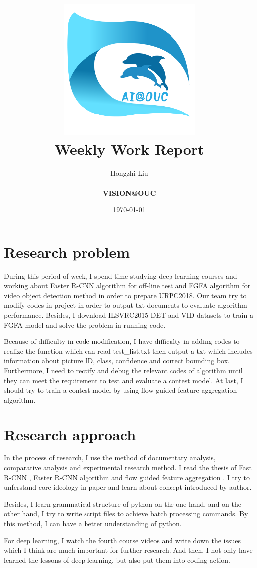 \documentclass[a4paper]{article}
\title{
    \vspace*{1in}
    \includegraphics[width=2.75in]{figures/zhenglab-logo} \\
    \vspace*{1.2in}
    \textbf{\huge Weekly Work Report}
    \vspace{0.2in}
}
\author{Hongzhi Liu \\
    \vspace*{0.5in} \\
    \textbf{VISION@OUC} \\
    \vspace*{1in}
}
\date{\today}
\begin{document}
\par
\maketitle
\setcounter{page}{0}
\thispagestyle{empty}

\newpage

\section{Research problem}

During this period of week, I spend time studying deep learning courses and working about Faster R-CNN algorithm for off-line test and FGFA algorithm for video object detection method in order to prepare URPC2018. Our team try to modify codes in project in order to output txt documents to evaluate algorithm performance. Besides, I download ILSVRC2015 DET and VID datasets to train a FGFA model and solve the problem in running code.

Because of difficulty in code modification, I have difficulty in adding codes to realize the function which can read test\_list.txt then output a txt which includes information about picture ID, class, confidence and correct bounding box. Furthermore, I need to rectify and debug the relevant codes of algorithm until they can meet the requirement to test and evaluate a contest model. At last, I should try to train a contest model by using flow guided feature aggregation algorithm. 

\section{Research approach}

In the process of research, I use the method of documentary analysis, comparative analysis and experimental research method. I read the thesis of Fast R-CNN \cite{Girshick2015Fast}, Faster R-CNN algorithm \cite{Ren2015Faster} and flow guided feature aggregation \cite{zhu17fgfa}. I try to unferstand core ideology in paper and learn about concept introduced by author.

Besides, I learn grammatical structure of python on the one hand, and on the other hand, I try to write script files to achieve batch processing commands. By this method, I can have a better understanding of python.

For deep learning, I watch the fourth course videos and write down the issues which I think are much important for further research. And then, I not only have learned the lessons of deep learning, but also put them into coding action. 
\end{document}
